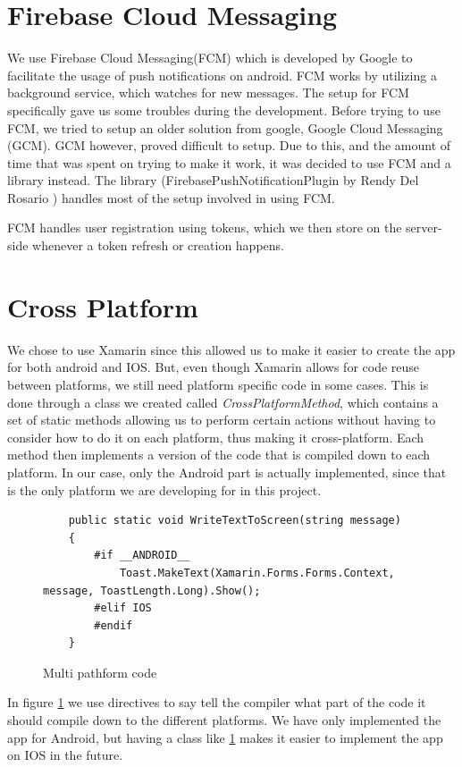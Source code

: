 \section{Firebase Cloud Messaging}
We use Firebase Cloud Messaging(FCM) which is developed by Google to facilitate the usage of push notifications on android. FCM works by utilizing a background service, which watches for new messages. The setup for FCM specifically gave us some troubles during the development. Before trying to use FCM, we tried to setup an older solution from google, Google Cloud Messaging (GCM). GCM however, proved difficult to setup. Due to this, and the amount of time that was spent on trying to make it work, it was decided to use FCM and a library instead. The library (FirebasePushNotificationPlugin by Rendy Del Rosario ) handles most of the setup involved in using FCM.

FCM handles user registration using tokens, which we then store on the server-side whenever a token refresh or creation happens.

\section{Cross Platform}
We chose to use Xamarin since this allowed us to make it easier to create the app for both android and IOS. But, even though Xamarin allows for code reuse between platforms, we still need platform specific code in some cases. This is done through a class we created called \textit{CrossPlatformMethod}, which contains a set of static methods allowing us to perform certain actions without having to consider how to do it on each platform, thus making it cross-platform. Each method then implements a version of the code that is compiled down to each platform. In our case, only the Android part is actually implemented, since that is the only platform we are developing for in this project. 

\begin{figure}[h]
    \centering
    \begin{lstlisting}
    public static void WriteTextToScreen(string message)
    {
        #if __ANDROID__
            Toast.MakeText(Xamarin.Forms.Forms.Context, message, ToastLength.Long).Show();
        #elif IOS
        #endif
    }
    \end{lstlisting}
    \caption{Multi pathform code}
    \label{fig:appMultiPlatform}
\end{figure}
In figure \ref{fig:appMultiPlatform} we use directives to say tell the compiler what part of the code it should compile down to the different platforms. We have only implemented the app for Android, but having a class like \ref{fig:appMultiPlatform} makes it easier to implement the app on IOS in the future.

